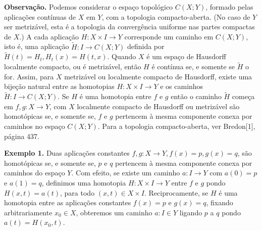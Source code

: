\textbf{Observação.} Podemos considerar o espaço topológico $C(X;Y)$,
formado pelas aplicações contínuas de $X$ em $Y$, com a topologia
compacto-aberta. (No caso de $Y$ ser metrizável, esta é a topologia da
convergência uniforme nas partes compactas de $X$.) A cada aplicação
$H \colon X \times I \to Y$ corresponde um caminho em $C(X;Y)$, isto
é, uma aplicação $\widetilde{H} \colon I \to C(X;Y)$ definida por
$\widetilde{H}(t) = H_t, H_t(x) = H(t,x)$. Quando $X$ é um espaço de
Hausdorff localmente compacto, ou é metrizável, então $H$ é contínua
se, e somente se $\widetilde{H}$ o for. Assim, para $X$ metrizável ou
localmente compacto de Hausdorff, existe uma bijeção natural entre as
homotopias $H \colon X \times I \to Y$ e os caminhos $\widetilde{H}
\colon I \to C(X;Y)$. Se $H$ é uma homotopia entre $f$ e $g$ então o
caminho $\widetilde{H}$ começa em $f,g \colon X \to Y$, com $X$
localmente compacto de Hausdorff ou metrizável são homotópicas se, e
somente se, $f$ e $g$ pertencem à mesma componente conexa por caminhos 
no espaço $C(X;Y)$. Para a topologia compacto-aberta, ver Bredon[1],
página 437.

\textbf{Exemplo 1.} Duas aplicações constantes $f, g \colon X \to Y,
f(x) = p, g(x) = q$, são homotópicas se, e somente se, $p$ e $q$
pertencem à mesma componente conexa por caminhos do espaço $Y$. Com
efeito, se existe um caminho $a \colon I \to Y$ com $a(0) = p$ e $a(1)
= q$, definimos uma homotopia $H \colon X \times I \to Y$ entre $f$ e
$g$ pondo $H(x, t) = a(t)$, para todo $(x, t) \in X \times I$.
Reciprocamente, se $H$ é uma homotopia entre as aplicações constantes
$f(x) = p$ e $g(x) = q$, fixando arbitrariamente $x_0 \in X$,
obteremos um caminho $a \colon I \in Y$ ligando $p$ a $q$ pondo $a(t)
= H(x_0, t)$.
